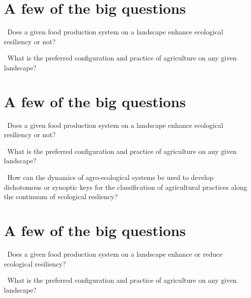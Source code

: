 \documentclass[
paper=128mm:96mm, %
fontsize=11pt, %
pagesize, %
parskip=half-, %
]{scrartcl} %
\theoremstyle{mythmstyle} %
\begin{document}
\section{A few of the big questions}
\footnotesize 
\textasteriskcentered \ Does a given food production system on a landscape enhance ecological resiliency or not?

\textasteriskcentered \ What is the preferred configuration and practice of agriculture on any given landscape?


\clearpage
\section{A few of the big questions}
\footnotesize 
\textasteriskcentered \ Does a given food production system on a landscape enhance ecological resiliency or not?

\textasteriskcentered \ What is the preferred configuration and practice of agriculture on any given landscape?

\textasteriskcentered \ How can the dynamics of agro-ecological systems be used to develop dichotomous or synoptic keys for the classification of agricultural practices along the continuum of ecological resliency?

\clearpage
\section{A few of the big questions}
\footnotesize 
\textasteriskcentered \ Does a given food production system on a landscape enhance or reduce ecological resiliency?

\textasteriskcentered \ What is the preferred configuration and practice of agriculture on any given landscape?
\end{document}
